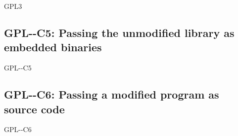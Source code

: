 \begin{license}{GPL3}
\subsection{GPL-\ver-C5: Passing the unmodified library as embedded binaries} 
\begin{lsuc}{GPL-\ver-C5}

  \useCaseFive

  \begin{lsucrequires}
    \lsucmandatory{\keepLicenseElements}
    \lsucmandatory{\gplthreeEnsureCopyrightNoticeBinary}
    \lsucmandatory{\giveLicense}\passingFilesCorrectly
    \lsucmandatory{\makeAllSourcesAvailable}
    \lsucmandatory{\describeHowToGetSource}
    \lsucmandatory{\addToCopyrightDialogLib}
    \lsucmandatory{\arrangeEnclosingBinaries}
    \lsucmandatory{\retainCopyrightNotices}
    \lsucoptional{\addToDocumentation}
  \end{lsucrequires}

  \begin{lsucprohibits}
    \lsucitem{\noPatentLitigation}
  \end{lsucprohibits}
\end{lsuc}

\subsection{GPL-\ver-C6: Passing a modified program as source code}
\begin{lsuc}{GPL-\ver-C6}

  \useCaseSix

  \begin{lsucrequires}
    \lsucmandatory{\keepLicenseElements}
    \lsucmandatory{\gplthreeEnsureCopyrightNoticeSource}
    \lsucmandatory{\giveLicense}\passingFilesCorrectly
    \lsucmandatory{\retainCopyrightNotices}
    \lsucmandatory{\addToCopyrightDialogApp}
    \lsucmandatory{\markProgramModifications}
    \lsucmandatory{\arrangeProgramChanges}\howToApplyTheseTerms
    \lsucoptional{\createChangelog}
    \lsucoptional{\addToDocumentation}
  \end{lsucrequires}

  \begin{lsucprohibits}
    \lsucitem{\noPatentLitigation}
  \end{lsucprohibits}
\end{lsuc}


\end{license}
